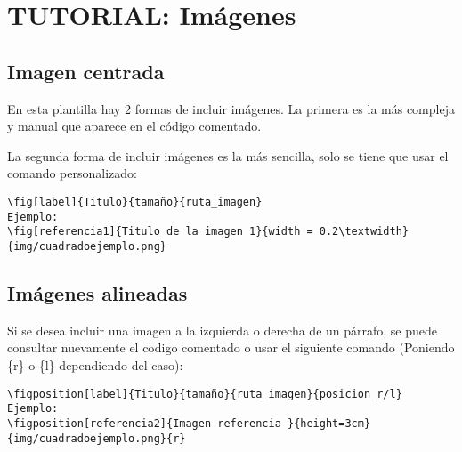 \section{TUTORIAL: Imágenes}
\subsection{Imagen centrada}
En esta plantilla hay 2 formas de incluir imágenes. La primera es la más compleja y manual que aparece en el código comentado.

La segunda forma de incluir imágenes es la más sencilla, solo se tiene que usar el comando personalizado:
\begin{verbatim}
\fig[label]{Titulo}{tamaño}{ruta_imagen}
Ejemplo:
\fig[referencia1]{Titulo de la imagen 1}{width = 0.2\textwidth}{img/cuadradoejemplo.png}
\end{verbatim}



\subsection{Imágenes alineadas}
Si se desea incluir una imagen a la izquierda o derecha de un párrafo, se puede consultar nuevamente el codigo comentado o usar el siguiente comando (Poniendo \{r\} o \{l\} dependiendo del caso):
\begin{verbatim}
\figposition[label]{Titulo}{tamaño}{ruta_imagen}{posicion_r/l}
Ejemplo:
\figposition[referencia2]{Imagen referencia }{height=3cm}{img/cuadradoejemplo.png}{r}
\end{verbatim}


